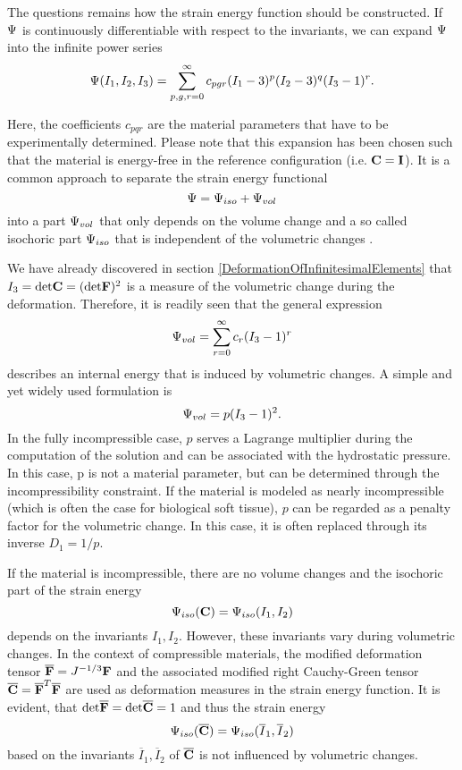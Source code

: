 The questions remains how the strain energy function should be constructed. If $\Psi$ is continuously differentiable with respect to the invariants, we can expand $\Psi$ into the infinite power series
 \begin{equation}
\Psi (I_1, I_2, I_3) = \sum _{p,g,r = 0} ^{\infty} c_{pgr} (I_1 - 3)^p (I_2 - 3)^q (I_3 - 1)^r.
\end{equation}

Here, the coefficients $c_{pqr}$ are the material parameters that have to be experimentally determined. Please note that this expansion has been chosen such that the material is energy-free in the reference configuration (i.e. $\mathbf {C}  =  \mathbf {I }$). It is a common approach to separate the strain energy functional 
 \begin{equation}
\Psi  = \Psi _{iso} + \Psi _{vol}
\end{equation}
into a part $\Psi_{vol}$ that only depends on the volume change and a so called isochoric part $\Psi _{iso}$ that is independent of the volumetric changes \cite{Holzapfel2000}. 

We have already discovered in section \ref{DeformationOfInfinitesimalElements} that $I_3 =  \textnormal{det} \mathbf {C}  = ( \textnormal{det} \mathbf {F })^2$ is a measure of the volumetric change during the deformation. Therefore, it is readily seen that the general expression
 \begin{equation}
\Psi _{vol} = \sum _{r = 0} ^{\infty} c_r (I_3 - 1)^r
\end{equation}
describes an internal energy that is induced by volumetric changes. A simple and yet widely used formulation is
 \begin{equation}
\Psi _{vol} =  p (I_3 - 1)^2.
\end{equation}
In the fully incompressible case, $p$ serves a Lagrange multiplier during the computation of the solution and can be associated with the hydrostatic pressure. In this case, p is not a material parameter, but can be determined through the incompressibility constraint. If the material is modeled as nearly incompressible (which is often the case for biological soft tissue), $p$ can be regarded as a penalty factor for the volumetric change. In this case, it is often replaced through its inverse $D_1 = 1 / p$.

If the material is incompressible, there are no volume changes and the isochoric part of the strain energy 
 \begin{equation}
 \Psi _{iso} (\mathbf {C}  )  = \Psi _{iso} (I_1, I_2)
\end{equation}
depends on the invariants $I_1, I_2$. However, these invariants vary during volumetric changes. In the context of compressible materials, the modified deformation tensor $\mathbf {\overline{F} } = J^{-1/3} \mathbf {F }$ and the associated modified right Cauchy-Green tensor $\mathbf {\overline{C} } = \mathbf {\overline{F} }^T \mathbf {\overline{F} }$ are used as deformation measures in the strain energy function. It is evident, that $ \textnormal{det} \mathbf {\overline{F} } =  \textnormal{det} \mathbf {\overline{C} } = 1$ and thus the strain energy
 \begin{equation}
 \Psi _{iso} (\mathbf {\overline{C} }) = \Psi _{iso} (\overline{I}_1, \overline{I}_2)
\end{equation}
based on the invariants $\overline{I}_1, \overline{I}_2$ of $\mathbf {\overline{C} }$ is not influenced by volumetric changes.

